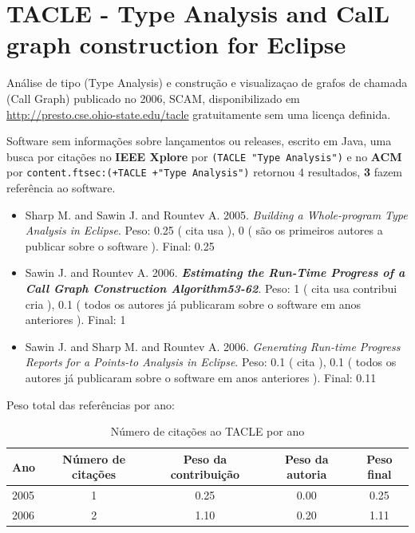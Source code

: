 \section{TACLE - Type Analysis and CalL graph construction for Eclipse}

Análise de tipo (Type Analysis) e construção e visualizaçao de grafos de chamada (Call Graph)
publicado no 2006, SCAM,
disponibilizado em \url{http://presto.cse.ohio-state.edu/tacle}
gratuitamente
sem uma licença definida.

Software sem informações sobre lançamentos ou releases,
escrito em Java,
uma busca por citações no {\bf IEEE Xplore} por
\texttt{(TACLE "Type Analysis")}
e no {\bf ACM} por
\texttt{content.ftsec:(+TACLE +"Type Analysis")}
retornou
4 resultados,
{\bf 3} fazem referência ao software.

\begin{itemize}
\item Sharp M. and Sawin J. and Rountev A.
      2005.
        \textit{ Building a Whole-program Type Analysis in Eclipse}.
      Peso:
      0.25 (
          cita
          usa
      ),
      0 (
são os primeiros autores a publicar sobre o software
      ).
      Final:
      0.25

\item Sawin J. and Rountev A.
      2006.
        \textbf{\textit{ Estimating the Run-Time Progress of a Call Graph Construction Algorithm53-62}}.
      Peso:
      1 (
          cita
          usa
          contribui
          cria
      ),
      0.1 (
todos os autores já publicaram sobre o software em anos anteriores
      ).
      Final:
      1

\item Sawin J. and Sharp M. and Rountev A.
      2006.
        \textit{ Generating Run-time Progress Reports for a Points-to Analysis in Eclipse}.
      Peso:
      0.1 (
          cita
      ),
      0.1 (
todos os autores já publicaram sobre o software em anos anteriores
      ).
      Final:
      0.11

\end{itemize}

Peso total das referências por ano:

\begin{table}[h]
\caption{Número de citações ao TACLE  por ano}
\centering
\begin{tabular}{| l | c | c | c | c |}
  \hline
  Ano & Número de citações & Peso da contribuição & Peso da autoria & Peso final \\
  \hline
  2005
    & 1
    & 0.25
    & 0.00
    & 0.25 \\
  2006
    & 2
    & 1.10
    & 0.20
    & 1.11 \\
  \hline
\end{tabular}
\end{table}



